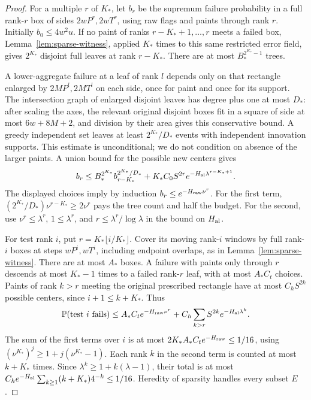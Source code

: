 \begin{proof}
For a multiple \(r\) of \(K_*\), let \(b_r\) be the supremum failure probability in a full rank-\(r\) box of sides \(2wP^r,2wT^r\), using raw flags and paints through rank \(r\). Initially \(b_0\le4w^2u\). If no paint of ranks \(r-K_*+1,\ldots,r\) meets a failed box, Lemma~\ref{lem:sparse-witness}, applied \(K_*\) times to this same restricted error field, gives \(2^{K_*}\) disjoint full leaves at rank \(r-K_*\). There are at most \(B_*^{2^{K_*}-1}\) trees.

A lower-aggregate failure at a leaf of rank \(l\) depends only on that rectangle enlarged by \(2MP^l,2MT^l\) on each side, once for paint and once for its support. The intersection graph of enlarged disjoint leaves has degree plus one at most \(D_*\): after scaling the axes, the relevant original disjoint boxes fit in a square of side at most \(6w+8M+2\), and division by their area gives this conservative bound. A greedy independent set leaves at least \(2^{K_*}/D_*\) events with independent innovation supports. This estimate is unconditional; we do not condition on absence of the larger paints. A union bound for the possible new centers gives
\begin{equation}\label{eq:paint-recursion}
b_r\le B_*^{2^{K_*}}b_{r-K_*}^{2^{K_*}/D_*}
       +K_*C_0S^{2r}e^{-H_{\rm al}\lambda^{r-K_*+1}}.
\end{equation}
The displayed choices imply by induction \(b_r\le e^{-H_{\rm raw}\nu^r}\). For the first term, \((2^{K_*}/D_*)\nu^{r-K_*}\ge2\nu^r\) pays the tree count and half the budget. For the second, use \(\nu^r\le\lambda^r\), \(1\le\lambda^r\), and \(r\le\lambda^r/\log\lambda\) in the bound on \(H_{\rm al}\).

For test rank \(i\), put \(r=K_*\lfloor i/K_*\rfloor\). Cover its moving rank-\(i\) windows by full rank-\(i\) boxes at steps \(wP^i,wT^i\), including endpoint overlaps, as in Lemma~\ref{lem:sparse-witness}. There are at most \(A_*\) boxes. A failure with paints only through \(r\) descends at most \(K_*-1\) times to a failed rank-\(r\) leaf, with at most \(A_*C_t\) choices. Paints of rank \(k>r\) meeting the original prescribed rectangle have at most \(C_hS^{2k}\) possible centers, since \(i+1\le k+K_*\). Thus
\begin{equation}\label{eq:paint-test}
\mathbb P(\text{test }i\text{ fails})\le A_*C_te^{-H_{\rm raw}\nu^r}
       +C_h\sum_{k>r}S^{2k}e^{-H_{\rm al}\lambda^k}.
\end{equation}
The sum of the first terms over \(i\) is at most \(2K_*A_*C_te^{-H_{\rm raw}}\le1/16\), using \((\nu^{K_*})^j\ge1+j(\nu^{K_*}-1)\). Each rank \(k\) in the second term is counted at most \(k+K_*\) times. Since \(\lambda^k\ge1+k(\lambda-1)\), their total is at most
\(C_he^{-H_{\rm al}}\sum_{k\ge1}(k+K_*)4^{-k}\le1/16\).
Heredity of sparsity handles every subset \(E\).
\end{proof}

